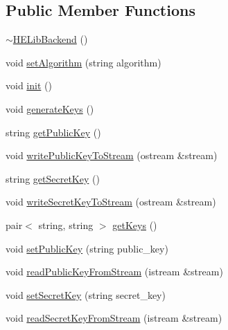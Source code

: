 \subsection*{Public Member Functions}
\begin{DoxyCompactItemize}
\item 
\mbox{\hyperlink{classhomomorphine_1_1_h_e_lib_backend_a1ef98efe05281fefbe6d044dc474017a}{$\sim$\+H\+E\+Lib\+Backend}} ()
\item 
void \mbox{\hyperlink{classhomomorphine_1_1_h_e_lib_backend_a39478377b0e299fd90f5c7bb6c8efe89}{set\+Algorithm}} (string algorithm)
\item 
void \mbox{\hyperlink{classhomomorphine_1_1_h_e_lib_backend_a6a7e7c8095f2287c41f7d93be91418ec}{init}} ()
\item 
void \mbox{\hyperlink{classhomomorphine_1_1_h_e_lib_backend_a2c6ed82eeb597b99ae6cdb2734412a0f}{generate\+Keys}} ()
\item 
string \mbox{\hyperlink{classhomomorphine_1_1_h_e_lib_backend_a8b096d4780f3b65f0fa0cb3ca6cb9ab8}{get\+Public\+Key}} ()
\item 
void \mbox{\hyperlink{classhomomorphine_1_1_h_e_lib_backend_acd7a366e43b8408d370424f136fc9f21}{write\+Public\+Key\+To\+Stream}} (ostream \&stream)
\item 
string \mbox{\hyperlink{classhomomorphine_1_1_h_e_lib_backend_a57af39a901a44fef6aad76503739fde4}{get\+Secret\+Key}} ()
\item 
void \mbox{\hyperlink{classhomomorphine_1_1_h_e_lib_backend_ac20314b484b23a46ff2070445576f413}{write\+Secret\+Key\+To\+Stream}} (ostream \&stream)
\item 
pair$<$ string, string $>$ \mbox{\hyperlink{classhomomorphine_1_1_h_e_lib_backend_ab45838cc01a4e71425e2aa0279e12c0e}{get\+Keys}} ()
\item 
void \mbox{\hyperlink{classhomomorphine_1_1_h_e_lib_backend_af54dc3990d99aab69c97172d0e5b4e51}{set\+Public\+Key}} (string public\+\_\+key)
\item 
void \mbox{\hyperlink{classhomomorphine_1_1_h_e_lib_backend_a2b9f132cc4dde870db1e69553349813b}{read\+Public\+Key\+From\+Stream}} (istream \&stream)
\item 
void \mbox{\hyperlink{classhomomorphine_1_1_h_e_lib_backend_a483a6695be2d733d48e2180ffb25d053}{set\+Secret\+Key}} (string secret\+\_\+key)
\item 
void \mbox{\hyperlink{classhomomorphine_1_1_h_e_lib_backend_ad1ed1336d11c5b75419efa58aa9071e3}{read\+Secret\+Key\+From\+Stream}} (istream \&stream)
\item 

\end{DoxyCompactItemize}
